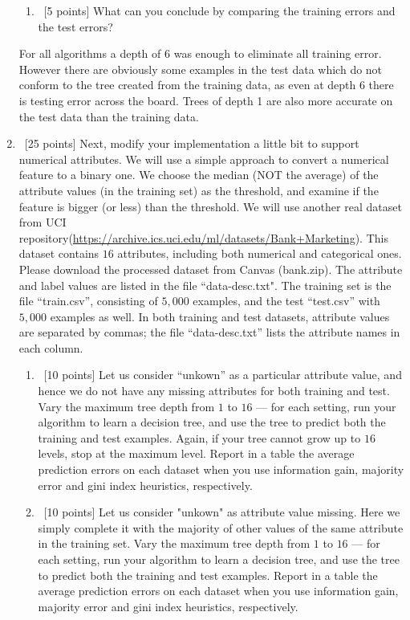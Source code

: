 \documentclass[12pt, fullpage,letterpaper]{article}
\begin{document}
\begin{enumerate}
\begin{enumerate}
\item~[5 points] What can you conclude by comparing the training errors and the test errors? 
\end{enumerate}

\begin{framed}
	  \newline
	For all algorithms a depth of 6 was enough to eliminate all training error. However there are obviously some examples in the test data which do not conform to the tree created from the training data, as even at depth 6 there is testing error across the board. Trees of depth 1 are also more accurate on the test data than the training data.
\end{framed}

\item~[25 points] Next, modify your implementation a little bit to support numerical attributes. We will use a simple approach to convert a numerical feature to a binary one. We choose the median (NOT the average) of the attribute values (in the training set) as the threshold, and examine if the feature is bigger (or less) than the threshold. We will use another real dataset from UCI repository(\url{https://archive.ics.uci.edu/ml/datasets/Bank+Marketing}). This dataset contains $16$ attributes, including both numerical and categorical ones. Please download the processed dataset from Canvas (bank.zip).  The attribute and label values are listed in the file ``data-desc.txt". The training set is the file ``train.csv'', consisting of $5,000$ examples, and the test  ``test.csv'' with $5,000$ examples as well.  In both training and test datasets, attribute values are separated by commas; the file ``data-desc.txt''  lists the attribute names in each column. 
\begin{enumerate}
	\item~[10 points] Let us consider ``unkown'' as a particular attribute value, and hence we do not have any missing attributes for both training and test. Vary the maximum  tree depth from $1$ to $16$ --- for each setting, run your algorithm to learn a decision tree, and use the tree to  predict both the training  and test examples. Again, if your tree cannot grow up to $16$ levels, stop at the maximum level. Report in a table the average prediction errors on each dataset when you use information gain, majority error and gini index heuristics, respectively.
	
	\item~[10 points] Let us consider "unkown" as  attribute value missing. Here we simply complete it with the majority of other values of the same attribute in the training set.   Vary the maximum  tree depth from $1$ to $16$ --- for each setting, run your algorithm to learn a decision tree, and use the tree to  predict both the training  and test examples. Report in a table the average prediction errors on each dataset when you use information gain, majority error and gini index heuristics, respectively.
	

\end{enumerate}
\end{enumerate}
\end{document}
